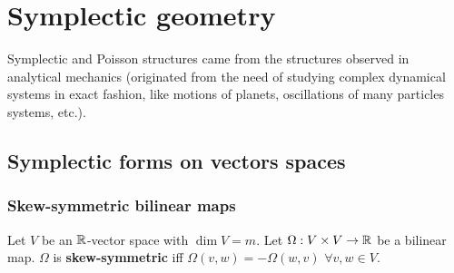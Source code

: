 \documentclass[main.tex]{subfiles}
\begin{document}
\chapter{Symplectic geometry}
Symplectic and Poisson structures came from the structures observed in analytical mechanics (originated from the need of studying complex dynamical systems in exact fashion, like motions of planets, oscillations of many particles systems, etc.).
\section{Symplectic forms on vectors spaces}
\subsection{Skew-symmetric bilinear maps}
\begin{definition}
	Let $V$ be an $\mathbb{R}$-vector space with $\dim V=m$. Let $\Omega:V\times V\to\mathbb{R}$ be a bilinear map. $\Omega$ is \textbf{skew-symmetric} iff $\Omega(v,w)=-\Omega(w,v)$ $\forall v,w\in V$.
\end{definition}
\end{document}

